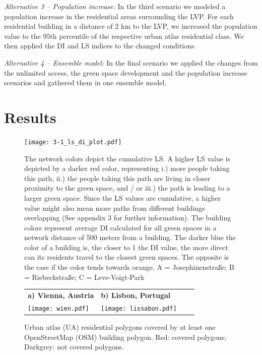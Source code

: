 \documentclass[10pt]{article}
\begin{document}
\textit{Alternative 3 – Population increase:} In the third scenario we modeled a population increase in the residential areas surrounding the LVP.
For each residential building in a distance of 2 km to the LVP, we increased the population value to the 95th percentile of the respective urban atlas residential class.
We then applied the DI and LS indices to the changed conditions.

\textit{Alternative 4 – Ensemble model:} In the final scenario we applied the changes from the unlimited access, the green space development and the population increase scenarios and gathered them in one ensemble model. 



\section{Results}

\begin{figure}
\centering
\texttt{[image: 3-1\_ls\_di\_plot.pdf]}
\caption{The network colors depict the cumulative LS. A higher LS value is depicted by a darker red color, representing i.) more people taking this path, ii.) the people taking this path are living in closer proximity to the green space, and / or iii.) the path is leading to a larger green space. Since the LS values are cumulative, a higher value might also mean more paths from different buildings overlapping (See appendix 3 for further information). The building colors represent average DI calculated for all green spaces in a network distance of 500 meters from a building. The darker blue the color of a building is, the closer to 1 the DI value, the more direct can its residents travel to the closest green spaces. The opposite is the case if the color tends towards orange.
A = Josephinenstraße; B = Riebeckstraße; C = Leve-Voigt-Park}
\label{fig:lsdi}
\end{figure}

\begin{figure}[h!]
\centering
\begin{tabular}{llll}
\textbf{a) Vienna, Austria} & \textbf{b) Lisbon, Portugal} \\
\texttt{[image: wien.pdf]} & \texttt{[image: lissabon.pdf]}
\end{tabular}
\caption{Urban atlas (UA) residential polygons covered by at least one OpenStreetMap (OSM) building polygon. Red: covered polygons; Darkgrey: not covered polygons.}
\label{fig:osmcovexample}
\end{figure}
\end{document}
